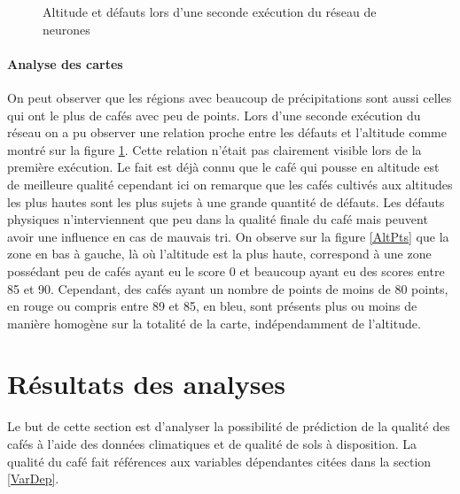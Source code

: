 \begin{figure}[H]
	\caption{\label{SecondSOMASNM}Altitude et défauts lors d'une seconde exécution du réseau de neurones}
	\centering
	\hfill
	\newline

	\centering
	\hfill
	\hfill
	\newline
	\centering 
\end{figure}

\newpage
\paragraph{Analyse des cartes}On peut observer que les régions avec beaucoup de précipitations sont aussi celles qui ont le plus de cafés avec peu de points. Lors d'une seconde exécution du réseau on a pu observer une relation proche entre les défauts et l'altitude comme montré sur la figure \ref{SecondSOMASNM}. Cette relation n'était pas clairement visible lors de la première exécution. Le fait est déjà connu que le café qui pousse en altitude est de meilleure qualité cependant ici on remarque que les cafés cultivés aux altitudes les plus hautes sont les plus sujets à une grande quantité de défauts. Les défauts physiques n'interviennent que peu dans la qualité finale du café mais peuvent avoir une influence en cas de mauvais tri. On observe sur la figure \ref{AltPts} que la zone en bas à gauche, là où l'altitude est la plus haute, correspond à une zone possédant peu de cafés ayant eu le score 0 et beaucoup ayant eu des scores entre 85 et 90. Cependant, des cafés ayant un nombre de points de moins de 80 points, en rouge ou compris entre 89 et 85, en bleu, sont présents plus ou moins de manière homogène sur la totalité de la carte, indépendamment de l'altitude.  









\newpage

\section{Résultats des analyses  }
Le but de cette section est d'analyser la possibilité de prédiction de la qualité des cafés à l'aide des données climatiques et de qualité de sols à disposition. La qualité du café fait références aux variables dépendantes citées dans la section \ref{VarDep}.

